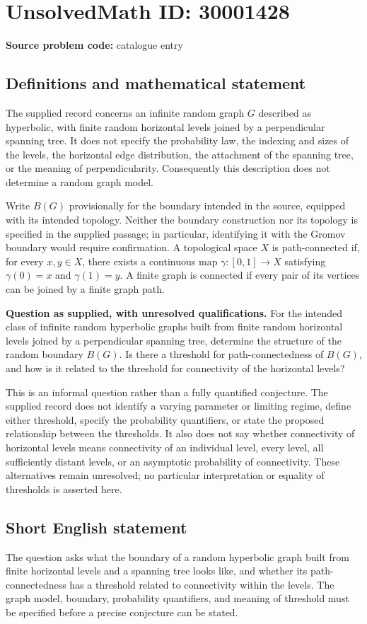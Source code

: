\documentclass[11pt]{article}
\begin{document}
\section*{UnsolvedMath ID: 30001428}
\textbf{Source problem code:} catalogue entry
\subsection{Definitions and mathematical statement}
The supplied record concerns an infinite random graph \(G\) described as hyperbolic, with finite random horizontal levels joined by a perpendicular spanning tree. It does not specify the probability law, the indexing and sizes of the levels, the horizontal edge distribution, the attachment of the spanning tree, or the meaning of perpendicularity. Consequently this description does not determine a random graph model.

Write \(B(G)\) provisionally for the boundary intended in the source, equipped with its intended topology. Neither the boundary construction nor its topology is specified in the supplied passage; in particular, identifying it with the Gromov boundary would require confirmation. A topological space \(X\) is path-connected if, for every \(x,y\in X\), there exists a continuous map \(\gamma\colon[0,1]\to X\) satisfying \(\gamma(0)=x\) and \(\gamma(1)=y\). A finite graph is connected if every pair of its vertices can be joined by a finite graph path.

\textbf{Question as supplied, with unresolved qualifications.} For the intended class of infinite random hyperbolic graphs built from finite random horizontal levels joined by a perpendicular spanning tree, determine the structure of the random boundary \(B(G)\). Is there a threshold for path-connectedness of \(B(G)\), and how is it related to the threshold for connectivity of the horizontal levels?

This is an informal question rather than a fully quantified conjecture. The supplied record does not identify a varying parameter or limiting regime, define either threshold, specify the probability quantifiers, or state the proposed relationship between the thresholds. It also does not say whether connectivity of horizontal levels means connectivity of an individual level, every level, all sufficiently distant levels, or an asymptotic probability of connectivity. These alternatives remain unresolved; no particular interpretation or equality of thresholds is asserted here.
\subsection{Short English statement}
The question asks what the boundary of a random hyperbolic graph built from finite horizontal levels and a spanning tree looks like, and whether its path-connectedness has a threshold related to connectivity within the levels. The graph model, boundary, probability quantifiers, and meaning of threshold must be specified before a precise conjecture can be stated.
\end{document}
